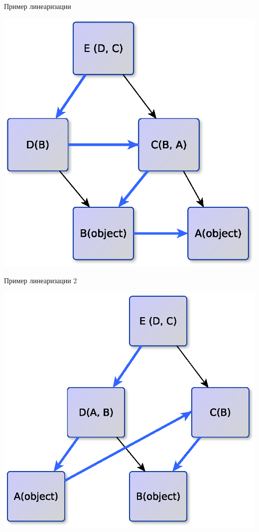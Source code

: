 \documentclass{article}
\begin{document}
\begin{center}Пример линеаризации\end{center}
\begin{center} \includegraphics{images/inheritance_1.eps} \end{center} 
\newpage

\begin{center}Пример линеаризации 2\end{center}
\begin{center} \includegraphics{images/inheritance_2.eps} \end{center} 
\newpage
\end{document}
